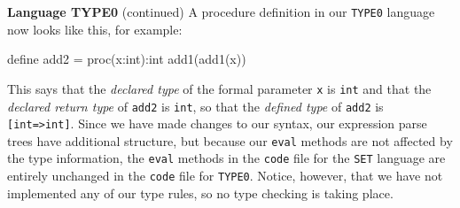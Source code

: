 \begin{minipage}[t]{\sw}
\slidenumber
\LARGE
{\bf Language TYPE0} (continued)\exx
A procedure definition in our \verb'TYPE0' language now looks like this,
for example:
\Large
\begin{qv}
define add2 = proc(x:int):int add1(add1(x))
\end{qv}
\LARGE
This says that the {\em declared type}
of the formal parameter \verb'x' is \verb'int'
and that the {\em declared return type} of \verb'add2' is \verb'int',
so that the {\em defined type} of \verb'add2' is \verb'[int=>int]'.\exx
Since we have made changes to our syntax,
our expression parse trees have additional structure,
but because our \verb'eval' methods are not affected by the type information,
the \verb'eval' methods in the \verb'code' file for the \verb'SET' language
are entirely unchanged in the \verb'code' file for \verb'TYPE0'.\exx
Notice, however,
that we have not implemented any of our type rules,
so no type checking is taking place.
\end{minipage}
